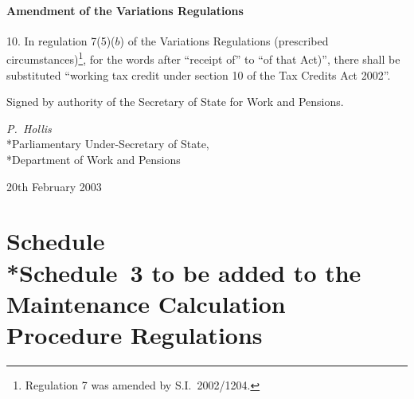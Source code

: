 \documentclass[12pt,a4paper]{article}
\begin{document}
\subsection[10. Amendment of the Variations Regulations]{Amendment of the Variations Regulations}

10.  In regulation 7(5)($b$)  of the Variations Regulations (prescribed circumstances)\footnote{Regulation 7 was amended by S.I.\ 2002/1204.}, for the words after “receipt of” to “of that Act)”, there shall be substituted “working tax credit under section 10 of the Tax Credits Act 2002”. 

\bigskip

Signed 
by authority of the Secretary of State for Work and Pensions.

{\raggedleft
\emph{P.~Hollis}\\*Parliamentary Under-Secretary of State,\\*Department of Work and Pensions

}


20th February 2003

\small

\part[Schedule --- Schedule 3 to be added to the Maintenance Calculation Procedure Regulations]{Schedule\\*Schedule~3 to be added to the Maintenance Calculation Procedure Regulations}

\renewcommand\parthead{--- Schedule}
\end{document}
